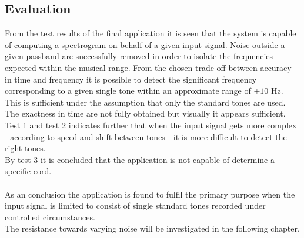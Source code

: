 \subsection{Evaluation}
From the test results of the final application it is seen that the system is capable of computing a spectrogram on behalf of a given input signal. Noise outside a given passband are successfully removed in order to isolate the frequencies expected within the musical range. From the chosen trade off between accuracy in time and frequency   it is possible to detect the significant frequency corresponding to a given single tone within an approximate range of $\pm 10$ Hz. This is sufficient under the assumption that only the standard tones are used. The exactness in time are not fully obtained but visually it appears sufficient.\\        
Test 1 and test 2 indicates further that when the input signal gets more complex - according to speed and shift between tones - it is more difficult to detect the right tones. \\
By test 3 it is concluded that the application is not capable of determine a specific cord.\\   
\\
As an conclusion the application is found to fulfil the primary purpose when the input signal is limited to consist of single standard tones recorded under controlled circumstances.\\
The resistance towards varying noise will be investigated in the following chapter.           